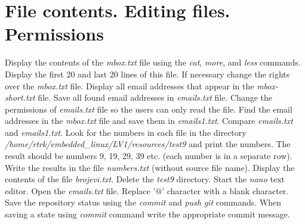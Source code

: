 \documentclass[11pt]{article}
\begin{document}
\section{File contents. Editing files. Permissions}
Display the contents of the \textit{mbox.txt} file using the \textit{cat},
 \textit{more}, and \textit{less} commands. Display the first 20 and last 20
 lines of this file. If necessary change the rights over the
 \textit{mbox.txt} file.
\newline
\newline
Display all email addresses that appear in the \textit{mbox-short.txt} file.
 Save all found email addresses in \textit{emails.txt} file. Change the
 permissions of \textit{emails.txt} file so the users can only read the file.
\newline
\newline
Find the email addresses in the \textit{mbox.txt} file and save them in
 \textit{emails1.txt}. Compare \textit{emails.txt} and \textit{emails1.txt}.
 Look for the numbers in each file in the directory
 \textit{/home/rtrk/embedded\_linux/LV1/resources/test9} and print the numbers.
 The result should be numbers 9, 19, 29, 39 etc. (each number is in a separate
 row). Write the results in the file \textit{numbers.txt} (without source file
 name). Display the contents of the file \textit{brojevi.txt}. Delete the
 \textit{test9} directory.
\newline
\newline
Start the \textit{nano} text editor. Open the \textit{emails.txt} file. Replace
 '@' character with a blank character.
\newline
\newline
Save the repository status using the \textit{commit} and \textit{push}
 \textit{git} commands. When saving a state using \textit{commit} command write
 the appropriate commit message.
\end{document}
